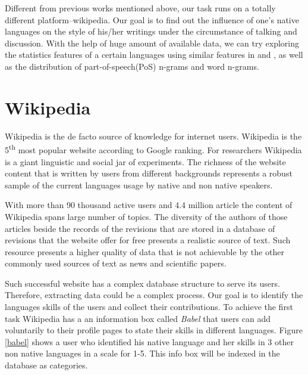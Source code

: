\documentclass[11pt]{article}
\begin{document}
Different from previous works mentioned above, our task runs on a totally different platform--wikipedia. Our goal is to find out the influence of one's native languages on the style of his/her writings under the circumstance of talking and discussion. With the help of huge amount of available data, we can try exploring the statistics features of a certain languages using similar features in  and , as well as the distribution of part-of-speech(PoS) n-grams and word n-grams.      

\section{Wikipedia}

Wikipedia is the de facto source of knowledge for internet users. Wikipedia is the 5\textsuperscript{th} most popular website according to Google ranking. For researchers Wikipedia is a giant linguistic and social jar of experiments. The richness of the website content that is written by users from different backgrounds represents a robust sample of the current languages usage by native and non native speakers.

With more than 90 thousand active users and 4.4 million article the content of Wikipedia spans large number of topics. The diversity of the authors of those articles beside the records of the revisions that are stored in a database of revisions that the website offer for free presents a realistic source of text. Such resource presents a higher quality of data that is not achievable by the other commonly used sources of text as news and scientific papers.

Such successful website has a complex database structure to serve its users. Therefore, extracting data could be a complex process. Our goal is to identify the languages skills of the users and collect their contributions. To achieve the first task Wikipedia has a an information box called \emph{Babel} that users can add voluntarily to their profile pages to state their skills in different languages. Figure \ref{babel} shows a user who identified his native language and her skills in 3 other non native languages in a scale for 1-5. This info box will be indexed in the database as categories.
\end{document}
